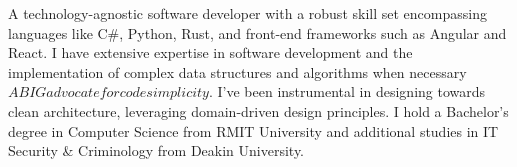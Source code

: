 
\par{
A technology-agnostic software developer with a robust skill set encompassing languages like C\#, Python, Rust, and front-end frameworks such as Angular and React. I have extensive expertise in software development and the implementation of complex data structures and algorithms when necessary \(A BIG advocate for code simplicity\). I've been instrumental in designing towards clean architecture, leveraging domain-driven design principles. I hold a Bachelor's degree in Computer Science from RMIT University and additional studies in IT Security \& Criminology from Deakin University.
}